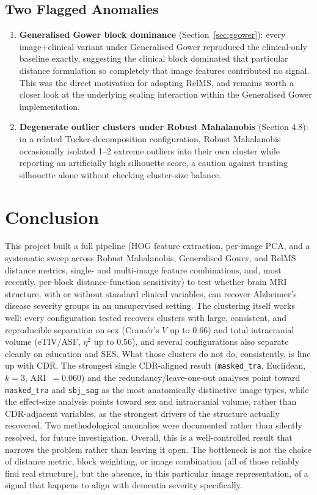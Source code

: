 \documentclass[11pt, a4paper]{article}
\begin{document}
\subsection{Two Flagged Anomalies}
\begin{enumerate}[leftmargin=1.4em]
    \item \textbf{Generalised Gower block dominance} (Section~\ref{sec:ggower}): every image+clinical
    variant under Generalised Gower reproduced the clinical-only baseline exactly, suggesting the
    clinical block dominated that particular distance formulation so completely that image features
    contributed no signal. This was the direct motivation for adopting RelMS, and remains worth a
    closer look at the underlying scaling interaction within the Generalised Gower implementation.
    \item \textbf{Degenerate outlier clusters under Robust Mahalanobis} (Section 4.8): in a related
    Tucker-decomposition configuration, Robust Mahalanobis occasionally isolated 1--2 extreme
    outliers into their own cluster while reporting an artificially high silhouette score, a
    caution against trusting silhouette alone without checking cluster-size balance.
\end{enumerate}


\section{Conclusion}

This project built a full pipeline (HOG feature extraction, per-image PCA, and a systematic
sweep across Robust Mahalanobis, Generalised Gower, and RelMS distance metrics, single- and
multi-image feature combinations, and, most recently, per-block distance-function sensitivity)
to test whether brain MRI structure, with or without standard clinical variables, can recover
Alzheimer's disease severity groups in an unsupervised setting. The clustering itself works well:
every configuration tested recovers clusters with large, consistent, and reproducible separation on
sex (Cram\'er's $V$ up to $0.66$) and total intracranial volume (eTIV/ASF, $\eta^2$ up to $0.56$),
and several configurations also separate cleanly on education and SES. What those clusters do not
do, consistently, is line up with CDR. The strongest single CDR-aligned result
(\texttt{masked\_tra}, Euclidean, $k=3$, ARI~$=0.060$) and the redundancy/leave-one-out analyses
point toward \texttt{masked\_tra} and \texttt{sbj\_sag} as the most anatomically distinctive image
types, while the effect-size analysis points toward sex and intracranial volume, rather than
CDR-adjacent variables, as the strongest drivers of the structure actually recovered. Two
methodological anomalies were documented rather than silently resolved, for future investigation.
Overall, this is a well-controlled result that narrows the problem rather than leaving it open. The
bottleneck is not the choice of distance metric, block weighting, or image combination (all of
those reliably find real structure), but the absence, in this particular image representation, of
a signal that happens to align with dementia severity specifically.
\end{document}
